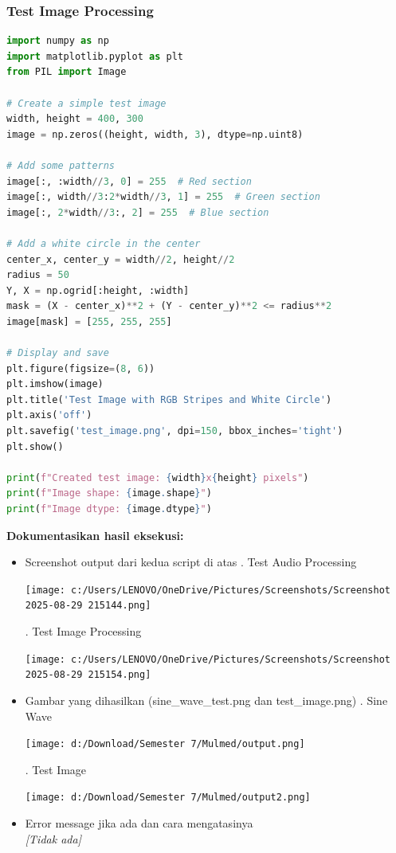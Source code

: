 \documentclass[11pt,a4paper]{article}
\begin{document}
\subsubsection{Test Image Processing}
\begin{lstlisting}[language=Python, caption=Test image processing sederhana]
import numpy as np
import matplotlib.pyplot as plt
from PIL import Image

# Create a simple test image
width, height = 400, 300
image = np.zeros((height, width, 3), dtype=np.uint8)

# Add some patterns
image[:, :width//3, 0] = 255  # Red section
image[:, width//3:2*width//3, 1] = 255  # Green section
image[:, 2*width//3:, 2] = 255  # Blue section

# Add a white circle in the center
center_x, center_y = width//2, height//2
radius = 50
Y, X = np.ogrid[:height, :width]
mask = (X - center_x)**2 + (Y - center_y)**2 <= radius**2
image[mask] = [255, 255, 255]

# Display and save
plt.figure(figsize=(8, 6))
plt.imshow(image)
plt.title('Test Image with RGB Stripes and White Circle')
plt.axis('off')
plt.savefig('test_image.png', dpi=150, bbox_inches='tight')
plt.show()

print(f"Created test image: {width}x{height} pixels")
print(f"Image shape: {image.shape}")
print(f"Image dtype: {image.dtype}")
\end{lstlisting}

\textbf{Dokumentasikan hasil eksekusi:}
\begin{itemize}
    \item Screenshot output dari kedua script di atas
    . Test Audio Processing
    \begin{flushleft}
        \texttt{[image: c:/Users/LENOVO/OneDrive/Pictures/Screenshots/Screenshot 2025-08-29 215144.png]}
    \end{flushleft}
    . Test Image Processing
        \begin{flushleft}
            \texttt{[image: c:/Users/LENOVO/OneDrive/Pictures/Screenshots/Screenshot 2025-08-29 215154.png]}
    \end{flushleft}
    \item Gambar yang dihasilkan (sine\_wave\_test.png dan test\_image.png)
    . Sine Wave
        \begin{flushleft}
            \texttt{[image: d:/Download/Semester 7/Mulmed/output.png]}
    \end{flushleft}
    . Test Image
        \begin{flushleft}
            \texttt{[image: d:/Download/Semester 7/Mulmed/output2.png]}
    \end{flushleft}
    \item Error message jika ada dan cara mengatasinya \\
    \textit{[Tidak ada]}
\end{itemize}
\end{document}
